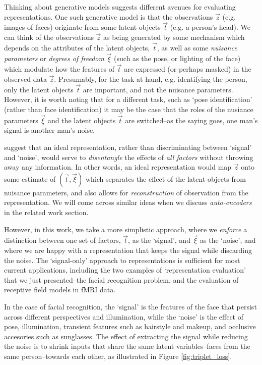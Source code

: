 
Thinking about generative models suggests different avenues for
evaluating representations.  One such generative model is that the
observations $\vec{z}$ (e.g. images of faces) originate from some
latent objects $\vec{t}$ (e.g. a person's head).  We can think of the
observations $\vec{z}$ as being generated by some mechanism which
depends on the attributes of the latent objects, $\vec{t}$, as well as
some \emph{nuisance parameters} or \emph{degrees of freedom}
$\vec{\xi}$ (such as the pose, or lighting of the face) which modulate
how the features of $\vec{t}$ are expressed (or perhaps masked) in the
observed data $\vec{z}$.  Presumably, for the task at hand,
e.g. identifying the person, only the latent objects $\vec{t}$ are
important, and not the nuisance parameters.  However, it is worth
noting that for a different task, such as `pose identification'
(rather than face identification) it may be the case that the roles of
the nusiance parameters $\vec{\xi}$ and the latent objects $\vec{t}$
are switched--as the saying goes, one man's signal is another man's
noise.

\cite{bengio2013representation} suggest that an ideal representation,
rather than discriminating between `signal' and `noise', would serve
to \emph{disentangle} the effects of \emph{all factors} without
throwing away any information.  In other words, an ideal
representation would map $\vec{z}$ onto some estimate of $(\vec{t},
\vec{\xi})$ which separates the effect of the latent objects from
nuisance parameters, and also allows for \emph{reconstruction} of
observation from the representation.  We will come across similar
ideas when we discuss \emph{auto-encoders} in the related work
section.

However, in this work, we take a more simplistic approach, where we
\emph{enforce} a distinction between one set of factors, $\vec{t}$, as
the `signal', and $\vec{\xi}$ as the `noise', and where we are happy
with a representation that keeps the signal while discarding the
noise. The `signal-only' approach to representations is sufficient for
most current applications, including the two examples of
`representation evaluation' that we just presented--the facial
recognition problem, and the evaluation of receptive field models in
fMRI data.

In the case of facial recognition, the `signal' is the features of the
face that persist across different perspectives and illumination,
while the `noise' is the effect of pose, illumination, transient
features such as hairstyle and makeup, and occlusive accesories such
as sunglasses.  
The effect of extracting the signal while reducing the
noise is to shrink inputs that share the same latent variables--faces
from the same person--towards each other, as illustrated in Figure
\ref{fig:triplet_loss}.

